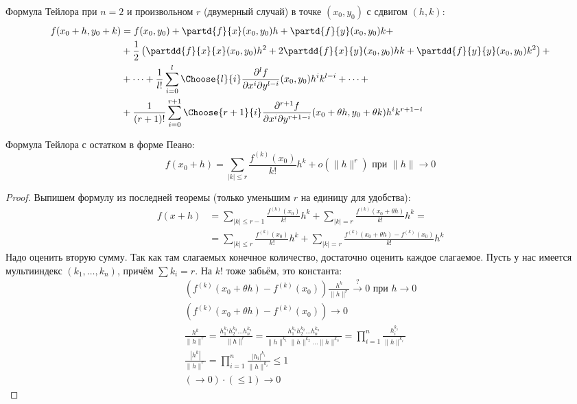 \begin{Rem}
	Формула Тейлора при $n=2$ и произвольном $r$ (двумерный случай) в точке $(x_0, y_0)$ с сдвигом $(h, k)$:
	\begin{align*}
		f(x_0+h, y_0+k)
			&= f(x_0, y_0)
			+ \partd{f}{x}(x_0, y_0)h + \partd{f}{y}(x_0, y_0)k + \\
			&+ \frac12\left(
				\partdd{f}{x}{x} (x_0, y_0) h^2
				+ 2\partdd{f}{x}{y} (x_0, y_0) hk
				+  \partdd{f}{y}{y} (x_0, y_0) k^2
			\right) + \\
			&+ \dots
			 + \frac{1}{    l!} \sum_{i=0}^l     \Choose{l  }{i} \frac{\partial^l     f}{\partial x^i \partial y^{l  -i}} (x_0, y_0)                   h^i k^{l  -i}
			 + \dots + \\
			&+ \frac{1}{(r+1)!} \sum_{i=0}^{r+1} \Choose{r+1}{i} \frac{\partial^{r+1} f}{\partial x^i \partial y^{r+1-i}} (x_0+\theta h, y_0+\theta k) h^i k^{r+1-i}
	\end{align*}
\end{Rem}

\begin{theorem}
	Формула Тейлора с остатком в форме Пеано:
	\[ f(x_0+h) = \sum_{|k|\le r} \frac{f^{(k)}(x_0)}{k!} h^k + o(\|h\|^r) \text{~при~} \|h\| \to 0\]
\end{theorem}
\begin{proof}
	Выпишем формулу из последней теоремы (только уменьшим $r$ на единицу для удобства):
	\begin{align*}
		f(x+h) &= \sum_{|k|\le r-1} \frac{f^{(k)}(x_0)}{k!} h^k + \sum_{|k|=r}\frac{f^{(k)}(x_0+\theta h)}{k!}h^k = \\
		       &= \sum_{|k|\le r  } \frac{f^{(k)}(x_0)}{k!} h^k + \sum_{|k|=r}\frac{f^{(k)}(x_0+\theta h)-f^{(k)}(x_0)}{k!}h^k
	\end{align*}
	Надо оценить вторую сумму.
	Так как там слагаемых конечное количество, достаточно оценить каждое слагаемое.
	Пусть у нас имеется мультииндекс $(k_1, \dots, k_n)$, причём $\sum k_i = r$.
	На $k!$ тоже забьём, это константа:
	\begin{gather*}
		\left(f^{(k)}(x_0+\theta h) - f^{(k)} (x_0)\right) \frac{h^k}{\|h\|^r} \stackrel{?}{\to} 0 \text{~при~} h \to 0 \\
		\left(f^{(k)}(x_0+\theta h) - f^{(k)} (x_0)\right) \to 0 \\
		\frac{h^k}{\|h\|^r}
			= \frac{h_1^{k_1}h_2^{k_2}\dots h_n^{k_n}}{\|h\|^r}
			= \frac{h_1^{k_1}h_2^{k_2}\dots h_n^{k_n}}{\|h\|^{k_1}\|h\|^{k_2}\dots\|h\|^{k_n}}
			= \prod_{i=1}^{n} \frac{h_i^{k_i}}{\|h\|^{k_i}} \\
		\frac{|h^k|}{\|h\|^r}
			= \prod_{i=1}^{n} \frac{|h_i|^{k_i}}{\|h\|^{k_i}}
			\le 1 \\
		(\to 0) \cdot (\le 1) \to 0
	\end{gather*}
\end{proof}

